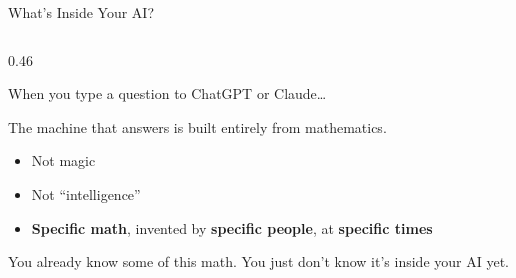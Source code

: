 \documentclass[aspectratio=169,12pt]{beamer}
\begin{document}
\begin{frame}{What's Inside Your AI?}

  \begin{columns}[T]
    \begin{column}{0.46\textwidth}
      {\small When you type a question to ChatGPT or Claude\ldots

      The machine that answers is built \alert{entirely from mathematics}.}

      \vspace{-0.1em}
      {\small
      \begin{itemize}\setlength\itemsep{-1pt}
        \item Not magic
        \item Not ``intelligence''
        \item \textbf{Specific math}, invented by \textbf{specific people},
              at \textbf{specific times}
      \end{itemize}}

      \vspace{-0.1em}
      \begin{tcolorbox}[colback=accentOrange!10, colframe=accentOrange,
        fonttitle=\bfseries\small, title={\faLightbulb\ Key Insight},
        rounded corners, boxrule=1pt, left=3pt, right=3pt, top=1pt, bottom=1pt]
        \small You already know some of this math.
        You just don't know it's inside your AI yet.
      \end{tcolorbox}
    \end{column}


\end{columns}
\end{frame}
\end{document}
